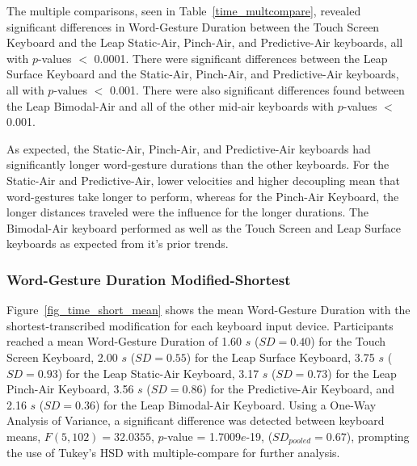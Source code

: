 The multiple comparisons, seen in Table~\ref{time_multcompare}, revealed significant differences in Word-Gesture Duration between the Touch Screen Keyboard and the Leap Static-Air, Pinch-Air, and Predictive-Air keyboards, all with $p$-values $<$ 0.0001. There were significant differences between the Leap Surface Keyboard and the Static-Air, Pinch-Air, and Predictive-Air keyboards, all with $p$-values $<$ 0.001. There were also significant differences found between the Leap Bimodal-Air and all of the other mid-air keyboards with $p$-values $<$ 0.001.

As expected, the Static-Air, Pinch-Air, and Predictive-Air keyboards had significantly longer word-gesture durations than the other keyboards. For the Static-Air and Predictive-Air, lower velocities and higher decoupling mean that word-gestures take longer to perform, whereas for the Pinch-Air Keyboard, the longer distances traveled were the influence for the longer durations. The Bimodal-Air keyboard performed as well as the Touch Screen and Leap Surface keyboards as expected from it's prior trends. 

\subsubsection{Word-Gesture Duration Modified-Shortest}
Figure~\ref{fig_time_short_mean} shows the mean Word-Gesture Duration with the shortest-transcribed modification for each keyboard input device. Participants reached a mean Word-Gesture Duration of 1.60 $s$ ($SD = 0.40$) for the Touch Screen Keyboard, 2.00 $s$ ($SD = 0.55$) for the Leap Surface Keyboard, 3.75 $s$ ($SD = 0.93$) for the Leap Static-Air Keyboard, 3.17 $s$ ($SD = 0.73$) for the Leap Pinch-Air Keyboard, 3.56 $s$ ($SD = 0.86$) for the Predictive-Air Keyboard, and 2.16 $s$ ($SD = 0.36$) for the Leap Bimodal-Air Keyboard. Using a One-Way Analysis of Variance, a significant difference was detected between keyboard means, $F(5, 102) = 32.0355$, $p$-value = 1.7009$e$-19, ($SD_{pooled} = 0.67$), prompting the use of Tukey's HSD with multiple-compare for further analysis.

